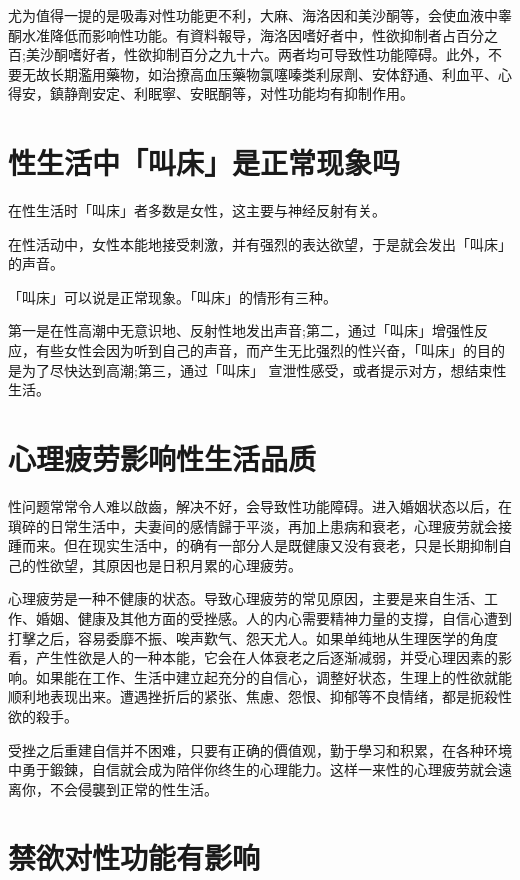 \documentclass[12pt,UTF8]{ctexbook}
\begin{document}
尤为值得一提的是吸毒对性功能更不利，大麻、海洛因和美沙酮等，会使血液中睾酮水准降低而影响性功能。有資料報导，海洛因嗜好者中，性欲抑制者占百分之百;美沙酮嗜好者，性欲抑制百分之九十六。两者均可导致性功能障碍。此外，不要无故长期濫用藥物，如治撩高血压藥物氯噻嗪类利尿劑、安体舒通、利血平、心得安，鎮静劑安定、利眠寧、安眠酮等，对性功能均有抑制作用。

\section{性生活中「叫床」是正常现象吗}

在性生活时「叫床」者多数是女性，这主要与神经反射有关。

在性活动中，女性本能地接受刺激，并有强烈的表达欲望，于是就会发出「叫床」的声音。

「叫床」可以说是正常现象。「叫床」的情形有三种。

第一是在性高潮中无意识地、反射性地发出声音;第二，通过「叫床」增强性反应，有些女性会因为听到自己的声音，而产生无比强烈的性兴奋，「叫床」的目的是为了尽快达到高潮;第三，通过「叫床」
宣泄性感受，或者提示对方，想结束性生活。

\section{心理疲劳影响性生活品质}

性问题常常令人难以啟齒，解决不好，会导致性功能障碍。进入婚姻状态以后，在瑣碎的日常生活中，夫妻间的感情歸于平淡，再加上患病和衰老，心理疲劳就会接踵而来。但在现实生活中，的确有一部分人是既健康又没有衰老，只是长期抑制自己的性欲望，其原因也是日积月累的心理疲劳。

心理疲劳是一种不健康的状态。导致心理疲劳的常见原因，主要是来自生活、工作、婚姻、健康及其他方面的受挫感。人的内心需要精神力量的支撐，自信心遭到打擊之后，容易委靡不振、唉声歎气、怨天尤人。如果单纯地从生理医学的角度看，产生性欲是人的一种本能，它会在人体衰老之后逐渐减弱，并受心理因素的影响。如果能在工作、生活中建立起充分的自信心，调整好状态，生理上的性欲就能顺利地表现出来。遭遇挫折后的紧张、焦慮、怨恨、抑郁等不良情绪，都是扼殺性欲的殺手。

受挫之后重建自信并不困难，只要有正确的價值观，勤于學习和积累，在各种环境中勇于鍛鍊，自信就会成为陪伴你终生的心理能力。这样一来性的心理疲劳就会遠离你，不会侵襲到正常的性生活。

\section{禁欲对性功能有影响}
\end{document}
